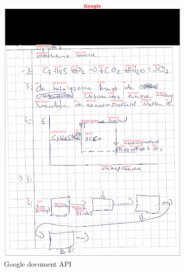 \documentclass[12pt]{article}
\begin{document}
\begin{multicols}{2}
\begin{figure}
    \centering
    \includegraphics[width=1\linewidth]{./images/methoden/inscannen/sectie/hand/google.png}
    \caption{Google document API}
    \label{fig:enter-label}
\end{figure}
\begin{figure}
    \centering

\end{figure}
\end{multicols}
\end{document}
